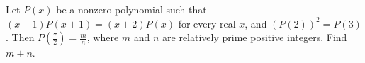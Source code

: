 Let $P(x)$ be a nonzero polynomial such that $(x-1)P(x+1)=(x+2)P(x)$ for every real $x$,  and $\left(P(2)\right)^2 = P(3)$. Then $P(\tfrac72)=\tfrac{m}{n}$,  where $m$ and $n$ are relatively prime positive integers. Find $m + n$.